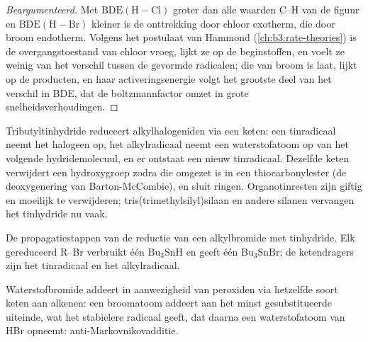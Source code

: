 \begin{proof}[Beargumenteerd]
Met $\mathrm{BDE(H{-}Cl)}$ groter dan alle waarden C--H van de figuur en $\mathrm{BDE(H{-}Br)}$ kleiner
is de onttrekking door chloor exotherm, die door broom endotherm. Volgens
het postulaat van Hammond (\cref{ch:b3:rate-theories}) is de
overgangstoestand van chloor vroeg, lijkt ze op de beginstoffen, en voelt
ze weinig van het verschil tussen de gevormde radicalen; die van broom is
laat, lijkt op de producten, en haar activeringsenergie volgt het
grootste deel van het verschil in BDE, dat de boltzmannfactor omzet in
grote snelheidsverhoudingen.
\end{proof}

Tributyltinhydride reduceert alkylhalogeniden via een keten: een
tinradicaal neemt het halogeen op, het alkylradicaal neemt een
waterstofatoom op van het volgende hydridemolecuul, en er ontstaat een
nieuw tinradicaal. Dezelfde keten verwijdert een hydroxygroep zodra die
omgezet is in een thiocarbonylester (de deoxygenering van
Barton-McCombie), en sluit ringen. Organotinresten zijn giftig en moeilijk
te verwijderen; tris(trimethylsilyl)silaan en andere silanen vervangen
het tinhydride nu vaak.

\begin{omfigure}

{\small De propagatiestappen van de reductie van een alkylbromide met
tinhydride. Elk gereduceerd R--Br verbruikt één $\mathrm{Bu_3SnH}$ en geeft één $\mathrm{Bu_3SnBr}$; de ketendragers
zijn het tinradicaal en het alkylradicaal.}
\end{omfigure}

Waterstofbromide addeert in aanwezigheid van peroxiden via hetzelfde soort
keten aan alkenen: een broomatoom addeert aan het minst gesubstitueerde
uiteinde, wat het stabielere radicaal geeft, dat daarna een waterstofatoom
van HBr opneemt: anti-Markovnikovadditie.

